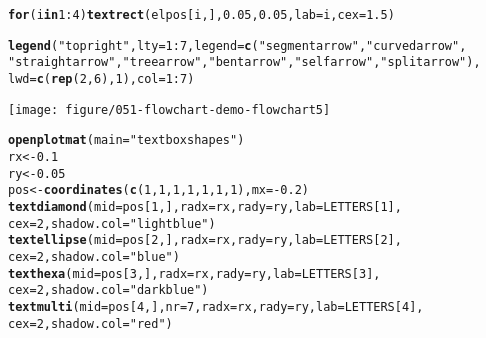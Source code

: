 \documentclass{article}\usepackage[]{graphicx}\usepackage[]{color}
\makeatletter
\def\maxwidth{ %
  \ifdim\Gin@nat@width>\linewidth
    \linewidth
  \else
    \Gin@nat@width
  \fi
}
\newcommand{\hlnum}[1]{\textcolor[rgb]{0.686,0.059,0.569}{#1}}%
\newcommand{\hlstr}[1]{\textcolor[rgb]{0.192,0.494,0.8}{#1}}%
\newcommand{\hlopt}[1]{\textcolor[rgb]{0,0,0}{#1}}%
\newcommand{\hlstd}[1]{\textcolor[rgb]{0.345,0.345,0.345}{#1}}%
\newcommand{\hlkwa}[1]{\textcolor[rgb]{0.161,0.373,0.58}{\textbf{#1}}}%
\newcommand{\hlkwb}[1]{\textcolor[rgb]{0.69,0.353,0.396}{#1}}%
\newcommand{\hlkwc}[1]{\textcolor[rgb]{0.333,0.667,0.333}{#1}}%
\newcommand{\hlkwd}[1]{\textcolor[rgb]{0.737,0.353,0.396}{\textbf{#1}}}%
\newenvironment{kframe}{%
 \def\at@end@of@kframe{}%
 \ifinner\ifhmode%
  \def\at@end@of@kframe{\end{minipage}}%
  \begin{minipage}{\columnwidth}%
 \fi\fi%
 \def\FrameCommand##1{\hskip\@totalleftmargin \hskip-\fboxsep
 \colorbox{shadecolor}{##1}\hskip-\fboxsep
     \hskip-\linewidth \hskip-\@totalleftmargin \hskip\columnwidth}%
 \MakeFramed {\advance\hsize-\width
   \@totalleftmargin\z@ \linewidth\hsize
   \@setminipage}}%
 {\par\unskip\endMakeFramed%
 \at@end@of@kframe}
\newenvironment{knitrout}{}{} %
\makeatother
\begin{document}
\begin{knitrout}
\begin{kframe}
\begin{alltt}
\hlkwa{for} \hlstd{(i} \hlkwa{in} \hlnum{1}\hlopt{:}\hlnum{4}\hlstd{)} \hlkwd{textrect}\hlstd{(elpos[i, ],} \hlnum{0.05}\hlstd{,} \hlnum{0.05}\hlstd{,} \hlkwc{lab} \hlstd{= i,} \hlkwc{cex} \hlstd{=} \hlnum{1.5}\hlstd{)}

\hlkwd{legend}\hlstd{(}\hlstr{"topright"}\hlstd{,} \hlkwc{lty} \hlstd{=} \hlnum{1}\hlopt{:}\hlnum{7}\hlstd{,} \hlkwc{legend} \hlstd{=} \hlkwd{c}\hlstd{(}\hlstr{"segmentarrow"}\hlstd{,} \hlstr{"curvedarrow"}\hlstd{,}
    \hlstr{"straightarrow"}\hlstd{,} \hlstr{"treearrow"}\hlstd{,} \hlstr{"bentarrow"}\hlstd{,} \hlstr{"selfarrow"}\hlstd{,} \hlstr{"splitarrow"}\hlstd{),}
    \hlkwc{lwd} \hlstd{=} \hlkwd{c}\hlstd{(}\hlkwd{rep}\hlstd{(}\hlnum{2}\hlstd{,} \hlnum{6}\hlstd{),} \hlnum{1}\hlstd{),} \hlkwc{col} \hlstd{=} \hlnum{1}\hlopt{:}\hlnum{7}\hlstd{)}
\end{alltt}
\end{kframe}
\texttt{[image: figure/051-flowchart-demo-flowchart5]} 
\begin{kframe}\begin{alltt}
\hlkwd{openplotmat}\hlstd{(}\hlkwc{main} \hlstd{=} \hlstr{"textbox shapes"}\hlstd{)}
\hlstd{rx} \hlkwb{<-} \hlnum{0.1}
\hlstd{ry} \hlkwb{<-} \hlnum{0.05}
\hlstd{pos} \hlkwb{<-} \hlkwd{coordinates}\hlstd{(}\hlkwd{c}\hlstd{(}\hlnum{1}\hlstd{,} \hlnum{1}\hlstd{,} \hlnum{1}\hlstd{,} \hlnum{1}\hlstd{,} \hlnum{1}\hlstd{,} \hlnum{1}\hlstd{,} \hlnum{1}\hlstd{),} \hlkwc{mx} \hlstd{=} \hlopt{-}\hlnum{0.2}\hlstd{)}
\hlkwd{textdiamond}\hlstd{(}\hlkwc{mid} \hlstd{= pos[}\hlnum{1}\hlstd{, ],} \hlkwc{radx} \hlstd{= rx,} \hlkwc{rady} \hlstd{= ry,} \hlkwc{lab} \hlstd{= LETTERS[}\hlnum{1}\hlstd{],}
    \hlkwc{cex} \hlstd{=} \hlnum{2}\hlstd{,} \hlkwc{shadow.col} \hlstd{=} \hlstr{"lightblue"}\hlstd{)}
\hlkwd{textellipse}\hlstd{(}\hlkwc{mid} \hlstd{= pos[}\hlnum{2}\hlstd{, ],} \hlkwc{radx} \hlstd{= rx,} \hlkwc{rady} \hlstd{= ry,} \hlkwc{lab} \hlstd{= LETTERS[}\hlnum{2}\hlstd{],}
    \hlkwc{cex} \hlstd{=} \hlnum{2}\hlstd{,} \hlkwc{shadow.col} \hlstd{=} \hlstr{"blue"}\hlstd{)}
\hlkwd{texthexa}\hlstd{(}\hlkwc{mid} \hlstd{= pos[}\hlnum{3}\hlstd{, ],} \hlkwc{radx} \hlstd{= rx,} \hlkwc{rady} \hlstd{= ry,} \hlkwc{lab} \hlstd{= LETTERS[}\hlnum{3}\hlstd{],}
    \hlkwc{cex} \hlstd{=} \hlnum{2}\hlstd{,} \hlkwc{shadow.col} \hlstd{=} \hlstr{"darkblue"}\hlstd{)}
\hlkwd{textmulti}\hlstd{(}\hlkwc{mid} \hlstd{= pos[}\hlnum{4}\hlstd{, ],} \hlkwc{nr} \hlstd{=} \hlnum{7}\hlstd{,} \hlkwc{radx} \hlstd{= rx,} \hlkwc{rady} \hlstd{= ry,} \hlkwc{lab} \hlstd{= LETTERS[}\hlnum{4}\hlstd{],}
    \hlkwc{cex} \hlstd{=} \hlnum{2}\hlstd{,} \hlkwc{shadow.col} \hlstd{=} \hlstr{"red"}\hlstd{)}

\end{alltt}
\end{kframe}
\end{knitrout}
\end{document}
